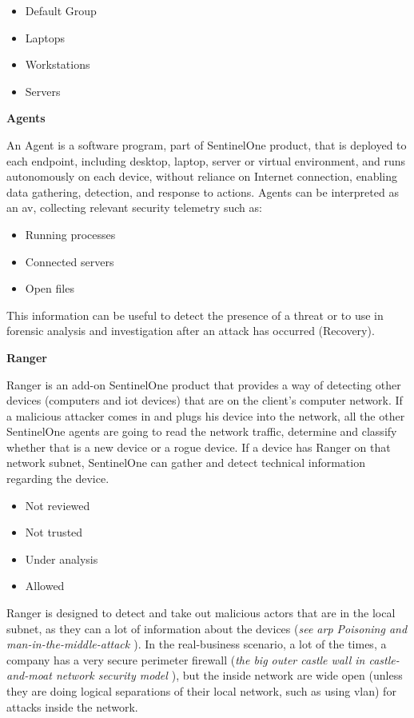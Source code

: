 \begin{multicols}{2}
      \begin{itemize}
            \item Default Group
            \item Laptops
            \item Workstations
            \item Servers
      \end{itemize}

      \textbf{Agents}

      An Agent is a software program, part of SentinelOne product, that is deployed to each endpoint, including desktop, laptop,
      server or virtual environment, and runs autonomously on each device, without reliance on Internet connection, enabling data
      gathering, detection, and response to actions. Agents can be interpreted as an \acrshort{av}, collecting relevant security
      telemetry such as:
      \begin{itemize}
            \item Running processes
            \item Connected servers
            \item Open files
      \end{itemize}
      This information can be useful to detect the presence of a threat or to use in forensic analysis and investigation after
      an attack has occurred (Recovery).

      \textbf{Ranger}

      Ranger is an add-on SentinelOne product that provides a way of detecting other devices (computers and
      \acrshort{iot} devices) that are on the client's computer network. If a malicious attacker comes in and plugs his device
      into the network, all the other SentinelOne agents are going to read the network traffic, determine and classify whether
      that is a new device or a rogue device. If a device has Ranger on that network subnet, SentinelOne can gather and
      detect technical information regarding the device.

      \begin{itemize}
            \item Not reviewed
            \item Not trusted
            \item Under analysis
            \item Allowed
      \end{itemize}

      Ranger is designed to detect and take out malicious actors that are in the local subnet, as they can a lot of information about the
      devices (\textit{see \acrshort{arp} Poisoning \cite{arpSpoofing} and man-in-the-middle-attack \cite{man-in-the-middleAttack}}).
      In the real-business scenario, a lot of the times, a company has a very secure perimeter firewall
      (\textit{the big outer castle wall in castle-and-moat network security model \cite{castleMoatWallNetwork}}), but the inside network
      are wide open (unless they are doing logical separations of their local network, such as using \acrshort{vlan}) for attacks inside
      the network.


\end{multicols}
